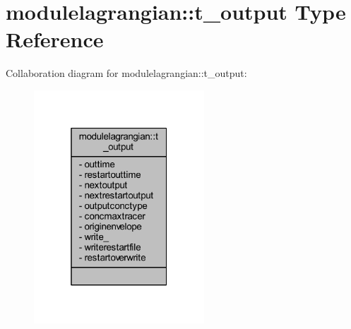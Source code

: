 \hypertarget{structmodulelagrangian_1_1t__output}{}\section{modulelagrangian\+:\+:t\+\_\+output Type Reference}
\label{structmodulelagrangian_1_1t__output}


Collaboration diagram for modulelagrangian\+:\+:t\+\_\+output\+:\nopagebreak
\begin{figure}[H]
\begin{center}
\leavevmode
\includegraphics[width=181pt]{structmodulelagrangian_1_1t__output__coll__graph}
\end{center}
\end{figure}
